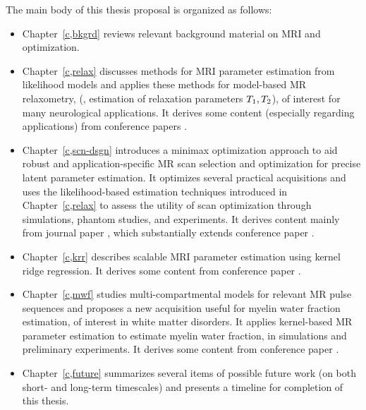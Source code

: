 The main body of this thesis proposal is organized as follows:
\begin{itemize}
\item 
	Chapter~\ref{c,bkgrd} reviews 
	relevant background material
	on MRI and optimization.
\item 
	Chapter~\ref{c,relax} discusses methods 
	for MRI parameter estimation 
	from likelihood models 
	and applies these methods 
	for model-based MR relaxometry, 
	(\ie, estimation of relaxation parameters $T_1,T_2$),
	of interest for many neurological applications.
	It derives some content 
	(especially regarding applications)
	from conference papers 
	\cite{nataraj:14:rje,nataraj:14:mbe}.
\item
	Chapter~\ref{c,scn-dsgn} introduces
	a minimax optimization approach
	to aid robust and application-specific 
	MR scan selection and optimization 
	for precise latent parameter estimation.
	It optimizes several practical acquisitions 
	and uses the likelihood-based estimation techniques 
	introduced in Chapter~\ref{c,relax}
	to assess the utility
	of scan optimization
	through simulations, 
	phantom studies, 
	and \invivo experiments.
	It derives content
	mainly from journal paper
	\cite{nataraj::oms},
	which substantially extends conference paper
	\cite{nataraj:15:amm}.
\item 
	Chapter~\ref{c,krr} describes 
	scalable MRI parameter estimation
	using kernel ridge regression.
	It derives some content 
	from conference paper
	\cite{nataraj:17:dfm}.
\item
	Chapter~\ref{c,mwf} studies multi-compartmental models
	for relevant MR pulse sequences
	and proposes a new acquisition 
	useful for myelin water fraction estimation,
	of interest in white matter disorders.
	It applies kernel-based MR parameter estimation
	to estimate myelin water fraction,
	in simulations and preliminary \invivo experiments.
	It derives some content from conference paper
	\cite{nataraj:17:mwf}.
\begin{comment}
\item
	Chapter~\ref{c,ss-rf} presents
	some relatively immature ideas
	on steady-state radiofrequency (RF) pulse design
	as well as associated challenges.
	This work is presently unpublished
	and may offer avenues for further research.
\end{comment}
\item 
	Chapter~\ref{c,future} summarizes several items 
	of possible future work
	(on both short- and long-term timescales) 
	and presents a timeline
	for completion of this thesis.
\end{itemize}

